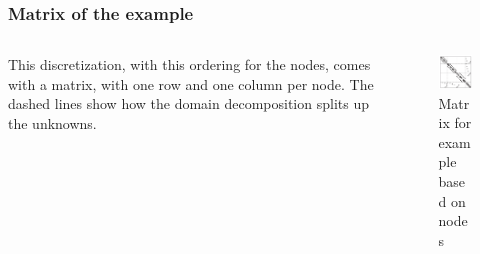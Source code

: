 \documentclass{beamer}
\begin{document}
\begin{frame}
\frametitle{Matrix of the example}

\begin{columns}
	\begin{column}{0.5\textwidth}
		This discretization, with this ordering for the nodes, comes with a matrix, with one row and one column per node.
		The dashed lines show how the domain decomposition splits up the unknowns.
	\end{column}
	\begin{column}{0.5\textwidth}
		\begin{figure}
			\centering
			\includegraphics[width=\textwidth]{FIG/Saad_Lshape_matrix.png}
			\caption{Matrix for example based on nodes}
		\end{figure}
	\end{column}
\end{columns}
\end{frame}
\end{document}
